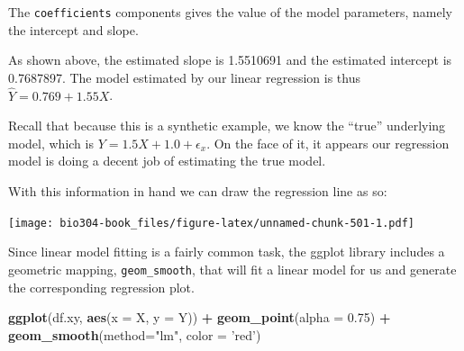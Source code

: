 \documentclass[]{book}
\newenvironment{Shaded}{\begin{snugshade}}{\end{snugshade}}
\newcommand{\CommentTok}[1]{\textcolor[rgb]{0.56,0.35,0.01}{\textit{#1}}}
\newcommand{\DataTypeTok}[1]{\textcolor[rgb]{0.13,0.29,0.53}{#1}}
\newcommand{\DecValTok}[1]{\textcolor[rgb]{0.00,0.00,0.81}{#1}}
\newcommand{\FloatTok}[1]{\textcolor[rgb]{0.00,0.00,0.81}{#1}}
\newcommand{\KeywordTok}[1]{\textcolor[rgb]{0.13,0.29,0.53}{\textbf{#1}}}
\newcommand{\NormalTok}[1]{#1}
\newcommand{\OperatorTok}[1]{\textcolor[rgb]{0.81,0.36,0.00}{\textbf{#1}}}
\newcommand{\StringTok}[1]{\textcolor[rgb]{0.31,0.60,0.02}{#1}}
\theoremstyle{definition}
\theoremstyle{definition}
\theoremstyle{definition}
\theoremstyle{remark}
\begin{document}
The \texttt{coefficients} components gives the value of the model
parameters, namely the intercept and slope.

\begin{Shaded}
\end{Shaded}

As shown above, the estimated slope is 1.5510691 and the estimated
intercept is 0.7687897. The model estimated by our linear regression is
thus \(\widehat{Y} = 0.769 + 1.55X\).

Recall that because this is a synthetic example, we know the ``true''
underlying model, which is \(Y = 1.5X + 1.0 + \epsilon_x\). On the face
of it, it appears our regression model is doing a decent job of
estimating the true model.

With this information in hand we can draw the regression line as so:

\begin{Shaded}
\end{Shaded}

\texttt{[image: bio304-book\_files/figure-latex/unnamed-chunk-501-1.pdf]}

Since linear model fitting is a fairly common task, the ggplot library
includes a geometric mapping, \texttt{geom\_smooth}, that will fit a
linear model for us and generate the corresponding regression plot.

\begin{Shaded}
\begin{Highlighting}[]
\KeywordTok{ggplot}\NormalTok{(df.xy, }\KeywordTok{aes}\NormalTok{(}\DataTypeTok{x =}\NormalTok{ X, }\DataTypeTok{y =}\NormalTok{ Y)) }\OperatorTok{+}\StringTok{ }
\StringTok{  }\KeywordTok{geom_point}\NormalTok{(}\DataTypeTok{alpha =} \FloatTok{0.75}\NormalTok{) }\OperatorTok{+}\StringTok{ }
\StringTok{  }\KeywordTok{geom_smooth}\NormalTok{(}\DataTypeTok{method=}\StringTok{"lm"}\NormalTok{, }\DataTypeTok{color =} \StringTok{'red'}\NormalTok{)}
\end{Highlighting}
\end{Shaded}
\end{document}
